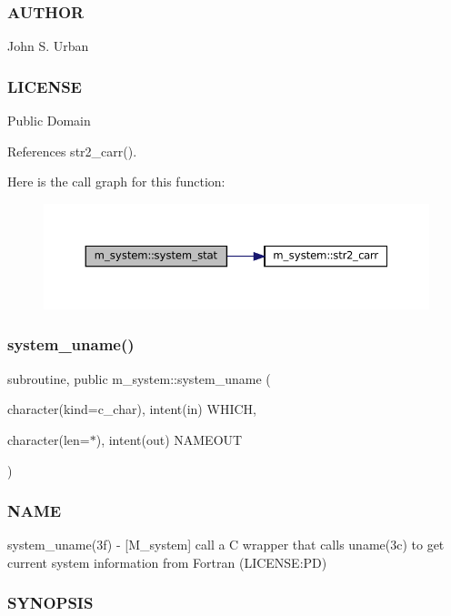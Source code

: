 \subsubsection*{A\+U\+T\+H\+OR}

John S. Urban \subsubsection*{L\+I\+C\+E\+N\+SE}

Public Domain 

References str2\+\_\+carr().

Here is the call graph for this function\+:\nopagebreak
\begin{figure}[H]
\begin{center}
\leavevmode
\includegraphics[width=350pt]{namespacem__system_a5bb1ebcebe181e07fd24e908cacc9887_cgraph}
\end{center}
\end{figure}
\mbox{\label{namespacem__system_a04e5d49509c44bcb2ccabfd80ec8cdfb}} 
\subsubsection{\texorpdfstring{system\+\_\+uname()}{system\_uname()}}
{\footnotesize\ttfamily subroutine, public m\+\_\+system\+::system\+\_\+uname (\begin{DoxyParamCaption}\item[{character(kind=c\+\_\+char), intent(in)}]{W\+H\+I\+CH,  }\item[{character(len=$\ast$), intent(out)}]{N\+A\+M\+E\+O\+UT }\end{DoxyParamCaption})}



\subsubsection*{N\+A\+ME}

system\+\_\+uname(3f) -\/ \mbox{[}M\+\_\+system\mbox{]} call a C wrapper that calls uname(3c) to get current system information from Fortran (L\+I\+C\+E\+N\+SE\+:PD) \subsubsection*{S\+Y\+N\+O\+P\+S\+IS}

